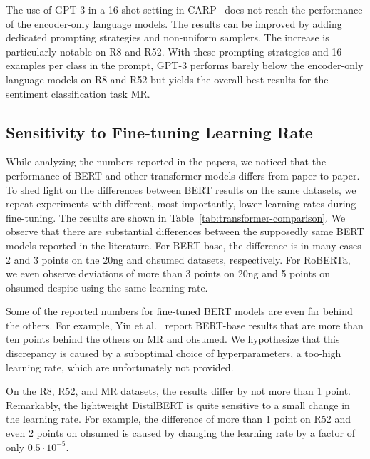 The use of GPT-3 in a 16-shot setting in CARP~\cite{carp} does not reach the performance of the encoder-only language models.
The results can be improved by adding dedicated prompting strategies and non-uniform samplers.
The increase is particularly notable on R8 and R52.
With these prompting strategies and 16 examples per class in the prompt, GPT-3 performs barely below the encoder-only language models on R8 and R52 but yields the overall best results for the sentiment classification task MR.

\subsection{Sensitivity to Fine-tuning Learning Rate}
While analyzing the numbers reported in the papers, we noticed that the performance of BERT and other transformer models differs from paper to paper.
To shed light on the differences between BERT results on the same datasets, we repeat experiments with different, most importantly, lower learning rates during fine-tuning.
The results are shown in Table~\ref{tab:transformer-comparison}.
We observe that there are substantial differences between the supposedly same BERT models reported in the literature.
For BERT-base, the difference is in many cases 2 and 3 points on the 20ng and ohsumed datasets, respectively.
For RoBERTa, we even observe deviations of more than 3 points on 20ng and 5 points on ohsumed despite using the same learning rate.

Some of the reported numbers for fine-tuned BERT models are even far behind the others.
For example, Yin et al.~\cite{gltc2023} report BERT-base results that are more than ten points behind the others on MR and ohsumed.
We hypothesize that this discrepancy is caused by a suboptimal choice of hyperparameters, \eg a too-high learning rate, which are unfortunately not provided.

On the R8, R52, and MR datasets, the results differ by not more than 1 point.
Remarkably, the lightweight DistilBERT is quite sensitive to a small change in the learning rate.
For example, the difference of more than 1 point on R52 and even 2 points on ohsumed is caused by changing the learning rate by a factor of only $0.5 \cdot 10^{-5}$.

\renewcommand{\myheader}{
  \caption{Comparison of different transformer models and hyperparameter settings. We report mean accuracy and standard deviation over five runs on the single-label text classification datasets (inductive). Column ``Provenance'' reports the source.
    N/P refers to the case where the paper (or potential supplementary materials) did not provide information about the learning rate.
    }
    
    \label{tab:transformer-comparison}
}


